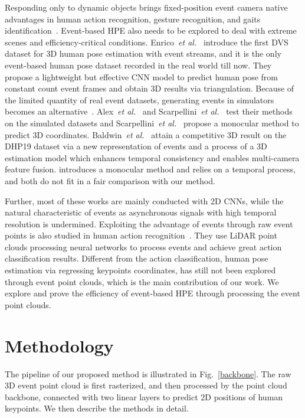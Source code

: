 \documentclass[10pt,twocolumn,letterpaper]{article}
\begin{document}
Responding only to dynamic objects brings fixed-position event camera native advantages in human action recognition, gesture recognition, and gaits identification~\cite{wang2019space, baby2017dynamichumanactivity, amir2017lowsnn, wu2020multipathhumanaction, wang2021eventgait}.
Event-based HPE also needs to be explored to deal with extreme scenes and efficiency-critical conditions. Enrico~\textit{et al.}~\cite{calabrese2019dhp19} introduce the first DVS dataset for 3D human pose estimation with event streams, and it is the only event-based human pose dataset recorded in the real world till now. 
They propose a lightweight but effective CNN model to predict human pose from constant count event frames and obtain 3D results via triangulation.
Because of the limited quantity of real event datasets, generating events in simulators becomes an alternative~\cite{gehrig2020video_to_events, rebecq2018esim_simulator,hu2021v2e}.
Alex~\textit{et al.}~\cite{zhu2021eventgan} and Scarpellini~\textit{et al.}~\cite{scarpellini2021lifting} test their methods on the simulated datasets and Scarpellini~\textit{et al.}~\cite{scarpellini2021lifting} propose a monocular method to predict 3D coordinates. Baldwin~\textit{et al.}~\cite{baldwin2022TORE} attain a competitive 3D result on the DHP19 dataset via a new representation of events and a process of a 3D estimation model which enhances temporal consistency and enables multi-camera feature fusion.
\cite{scarpellini2021lifting} introduces a monocular method and \cite{baldwin2022TORE} relies on a temporal process, and both do not fit in a fair comparison with our method.

Further, most of these works are mainly conducted with 2D CNNs, while the natural characteristic of events as asynchronous signals with high temporal resolution is undermined. Exploiting the advantage of events through raw event points is also studied in human action recognition~\cite{wang2019space, chen2020eventdgcnn}. They use LiDAR point clouds processing neural networks to process events and achieve great action classification results.
Different from the action classification, human pose estimation via regressing keypoints coordinates, has still not been explored through event point clouds, which is the main contribution of our work. We explore and prove the efficiency of event-based HPE through processing the event point clouds.

\section{Methodology}
The pipeline of our proposed method is illustrated in Fig.~\ref{backbone}. The raw 3D event point cloud is first rasterized, and then processed by the point cloud backbone, connected with two linear layers to predict 2D positions of human keypoints. We then describe the methods in detail.
\end{document}
